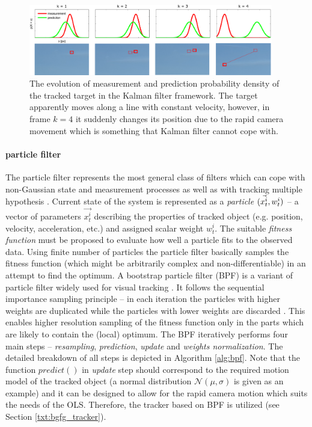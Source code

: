 \begin{figure}[tbh]
	\centering
	\includegraphics[width=0.95\textwidth]{fig/kalman.pdf}
	\caption{The evolution of measurement and prediction probability density of the tracked target in the Kalman filter framework. The target apparently moves along a line with constant velocity, however, in frame $k = 4$ it suddenly changes its position due to the rapid camera movement which is something that Kalman filter cannot cope with.}
	\label{fig:kalman}
\end{figure}

\paragraph{particle filter} 
The particle filter represents the most general class of filters which can cope with non-Gaussian state and measurement processes as well as with tracking multiple hypothesis \cite{journals/cviu/BimboD11}. Current state of the system is represented as a \textit{particle} $(\vec{x_{t}^{i}},w_{t}^{i})$ -- a vector of parameters ${\vec{x_{t}^{i}}}$ describing the properties of tracked object (e.g. position, velocity, acceleration, etc.) and assigned scalar weight $w_{t}^{i}$. The suitable \textit{fitness function} must be proposed to evaluate how well a particle fits to the observed data. Using finite number of particles the particle filter basically samples the fitness function (which might be arbitrarily complex and non-differentiable) in an attempt to find the optimum. A bootstrap particle filter (BPF) is a variant of particle filter widely used for visual tracking \cite{Isard98condensation}. It follows the sequential importance sampling principle -- in each iteration the particles with higher weights are duplicated while the particles with lower weights are discarded \cite{doucet2001sequential}. This enables higher resolution sampling of the fitness function only in the parts which are likely to contain the (local) optimum. The BPF iteratively performs four main steps -- \textit{resampling}, \textit{prediction}, \textit{update} and \textit{weights normalization}. The detailed breakdown of all steps is depicted in Algorithm \ref{alg:bpf}. Note that the function $predict()$ in \textit{update} step should correspond to the required motion model of the tracked object (a normal distribution $\mathcal{N}(\mu, \sigma)$ is given as an example) and it can be designed to allow for the rapid camera motion which suits the needs of the OLS. Therefore, the tracker based on BPF is utilized (see Section \ref{txt:bgfg_tracker}).

